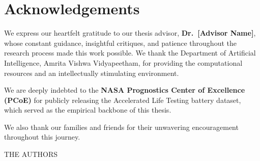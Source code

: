 \documentclass[a4paper, 12pt]{report}
\theoremstyle{definition}
\begin{document}
\clearpage
{}
\tableofcontents

\chapter*{Acknowledgements}

We express our heartfelt gratitude to our thesis advisor,
\textbf{Dr.~[Advisor Name]}, whose constant guidance, insightful
critiques, and patience throughout the research process made this work
possible. We thank the Department of Artificial Intelligence, Amrita
Vishwa Vidyapeetham, for providing the computational resources and an
intellectually stimulating environment.

We are deeply indebted to the \textbf{NASA Prognostics Center of
Excellence (PCoE)} for publicly releasing the Accelerated Life Testing
battery dataset, which served as the empirical backbone of this thesis.

We also thank our families and friends for their unwavering
encouragement throughout this journey.

\vspace{1cm}
\begin{flushright}
  THE AUTHORS
\end{flushright}

\makeatletter
\listoffigures
{}
\listoftables
{}
\makeatother

\newpage
\end{document}
